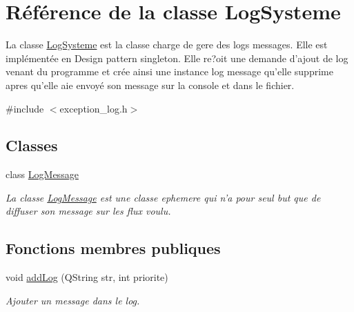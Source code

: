\hypertarget{class_log_systeme}{\section{Référence de la classe Log\-Systeme}
\label{class_log_systeme}
}


La classe \hyperlink{class_log_systeme}{Log\-Systeme} est la classe charge de gere des logs messages. Elle est implémentée en Design pattern singleton. Elle re?oit une demande d'ajout de log venant du programme et crée ainsi une instance log message qu'elle supprime apres qu'elle aie envoyé son message sur la console et dans le fichier.  




{\ttfamily \#include $<$exception\-\_\-log.\-h$>$}

\subsection*{Classes}
\begin{DoxyCompactItemize}
\item 
class \hyperlink{class_log_systeme_1_1_log_message}{Log\-Message}
\begin{DoxyCompactList}\small\item\em La classe \hyperlink{class_log_systeme_1_1_log_message}{Log\-Message} est une classe ephemere qui n'a pour seul but que de diffuser son message sur les flux voulu. \end{DoxyCompactList}\end{DoxyCompactItemize}
\subsection*{Fonctions membres publiques}
\begin{DoxyCompactItemize}
\item 
void \hyperlink{class_log_systeme_a0b550ea4cee3de636dccdfd253f1f82e}{add\-Log} (Q\-String str, int priorite)
\begin{DoxyCompactList}\small\item\em Ajouter un message dans le log. \end{DoxyCompactList}\end{DoxyCompactItemize}
